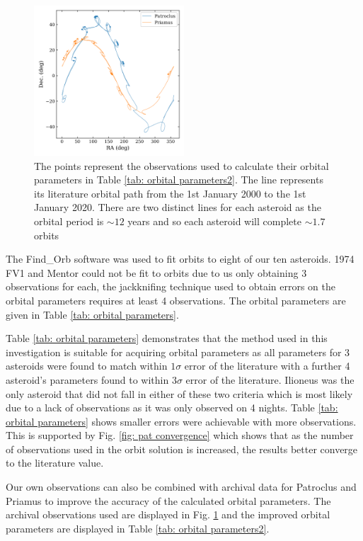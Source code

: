 \documentclass[10pt, twocolumn]{revtex4}    %
\begin{document}
\begin{figure}[h!]
\centering
\includegraphics[width=0.5\textwidth]{20180402_171730_OBSERVATIONS_MAP}
\caption{The points represent the observations used to calculate their orbital parameters in Table \ref{tab: orbital parameters2}. The line represents its literature orbital path from the 1st January 2000 to the 1st January 2020. There are two distinct lines for each asteroid as the orbital period is ${\sim}12$ years and so each asteroid will complete ${\sim}1.7$ orbits}
\label{fig: observations2}
\end{figure}

The Find\_Orb software was used to fit orbits to eight of our ten asteroids. 1974 FV1 and Mentor could not be fit to orbits due to us only obtaining 3 observations for each, the jackknifing technique used to obtain errors on the orbital parameters requires at least 4 observations. The orbital parameters are given in Table \ref{tab: orbital parameters}.

Table \ref{tab: orbital parameters} demonstrates that the method used in this investigation is suitable for acquiring orbital parameters as all parameters for 3 asteroids were found to match within $1\sigma$ error of the literature with a further 4 asteroid's parameters found to within $3\sigma$ error of the literature. Ilioneus was the only asteroid that did not fall in either of these two criteria which is most likely due to a lack of observations as it was only observed on 4 nights. Table \ref{tab: orbital parameters} shows smaller errors were achievable with more observations. This is supported by Fig. \ref{fig: pat convergence} which shows that as the number of observations used in the orbit solution is increased, the results better converge to the literature value.

Our own observations can also be combined with archival data for Patroclus and Priamus to improve the accuracy of the calculated orbital parameters. The archival observations used are displayed in Fig. \ref{fig: observations2} and the improved orbital parameters are displayed in Table \ref{tab: orbital parameters2}.
\end{document}
